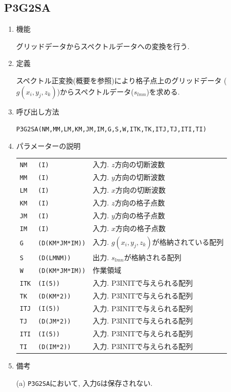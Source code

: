 \documentclass[a4j,fleqn]{jarticle}
\begin{document}

\subsection{P3G2SA}

\begin{enumerate}

\item 機能 

グリッドデータからスペクトルデータへの変換を行う.

\item 定義

スペクトル正変換(概要を参照)により格子点上のグリッドデータ
($g(x_i,y_j,z_k)$)からスペクトルデータ($s_{lmn}$)を求める.

\item 呼び出し方法 

{\tt P3G2SA(NM,MM,LM,KM,JM,IM,G,S,W,ITK,TK,ITJ,TJ,ITI,TI)}
  
\item パラメーターの説明

\begin{tabular}{lll}
{\tt NM} & {\tt (I)} & 入力. $z$方向の切断波数\\
{\tt MM} & {\tt (I)} & 入力. $y$方向の切断波数\\
{\tt LM} & {\tt (I)} & 入力. $x$方向の切断波数\\
{\tt KM} & {\tt (I)} & 入力. $z$方向の格子点数\\
{\tt JM} & {\tt (I)} & 入力. $y$方向の格子点数\\
{\tt IM} & {\tt (I)} & 入力. $x$方向の格子点数\\
{\tt G} & {\tt (D(KM*JM*IM))} & 入力. $g(x_i,y_j,z_k)$が格納されている配列\\
{\tt S} & {\tt (D(LMNM))} & 
                 出力. $s_{lmn}$が格納される配列\\
{\tt W} & {\tt (D(KM*JM*IM))} & 作業領域\\
{\tt ITK} & {\tt (I(5))} & 入力. P3INITで与えられる配列\\
{\tt TK} & {\tt (D(KM*2))} & 入力. P3INITで与えられる配列\\
{\tt ITJ} & {\tt (I(5))} & 入力. P3INITで与えられる配列\\
{\tt TJ} & {\tt (D(JM*2))} & 入力. P3INITで与えられる配列\\
{\tt ITI} & {\tt (I(5))} & 入力. P3INITで与えられる配列\\
{\tt TI} & {\tt (D(IM*2))} & 入力. P3INITで与えられる配列
\end{tabular}

\item 備考

(a) {\tt P3G2SA}において, 入力{\tt G}は保存されない.

\end{enumerate}
\end{document}
